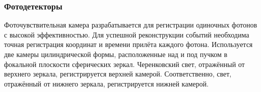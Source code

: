 %                                      

\subsubsection{Фотодетекторы}\label{sec:CbmRichCamera}

Фоточувствительная камера разрабатывается для регистрации одиночных фотонов с высокой эффективностью. Для успешной реконструкции событий необходима точная регистрация координат и времени прилёта каждого фотона.
Используется две камеры цилиндрической формы, расположенные над и под пучком в фокальной плоскости сферических зеркал. Черенковский свет, отражённый от верхнего зеркала, регистрируется верхней камерой. Соответственно, свет, отражённый от нижнего зеркала, регистрируется нижней камерой.

